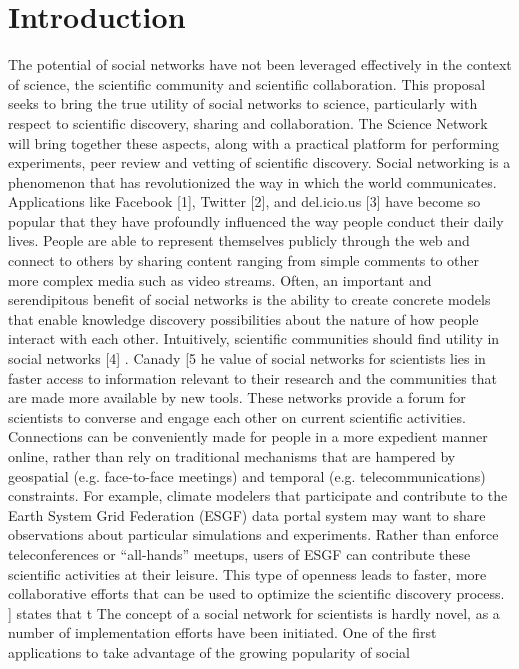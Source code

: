\section{Introduction}

The potential of social networks have not been leveraged effectively in the context of science, the
scientific community and scientific collaboration. This proposal seeks to bring the true utility of social
networks to science, particularly with respect to scientific discovery, sharing and collaboration. The
Science Network will bring together these aspects, along with a practical platform for performing
experiments, peer review and vetting of scientific discovery.
Social networking is a phenomenon that has revolutionized the way in which the world communicates.
Applications like Facebook [1], Twitter [2], and del.icio.us [3] have become so popular that they have
profoundly influenced the way people conduct their daily lives. People are able to represent themselves
publicly through the web and connect to others by sharing content ranging from simple comments to
other more complex media such as video streams. Often, an important and serendipitous benefit of social
networks is the ability to create concrete models that enable knowledge discovery possibilities about the
nature of how people interact with each other.
Intuitively, scientific communities should find utility in social networks [4]
. Canady [5
he
value of social networks for scientists lies in faster access to information relevant to their research and the
communities that are made more available by new tools. These networks provide a forum for scientists to
converse and engage each other on current scientific activities. Connections can be conveniently made
for people in a more expedient manner online, rather than rely on traditional mechanisms that are
hampered by geospatial (e.g. face-to-face meetings) and temporal (e.g. telecommunications) constraints.
For example, climate modelers that participate and contribute to the Earth System Grid Federation
(ESGF) data portal system may want to share observations about particular simulations and experiments.
Rather than enforce teleconferences or “all-hands” meetups, users of ESGF can contribute these scientific
activities at their leisure. This type of openness leads to faster, more collaborative efforts that can be used
to optimize the scientific discovery process.
] states that t
The concept of a social network for scientists is hardly novel, as a number of implementation efforts have
been initiated. One of the first applications to take advantage of the growing popularity of social
